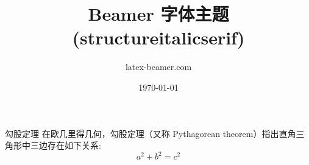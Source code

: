\documentclass{ctexbeamer}
\title{Beamer 字体主题 (structureitalicserif)}
\author{latex-beamer.com}
\date{\today}
\begin{document}
\begin{frame}
  \titlepage 
\end{frame}

\begin{frame}
   
\begin{block}{勾股定理}
在欧几里得几何，勾股定理（又称 Pythagorean theorem）指出直角三角形中三边存在如下关系:
\begin{equation}
  a^{2}+b^{2}=c^{2}
\end{equation}  
\end{block}   
 
\end{frame}
\end{document}

